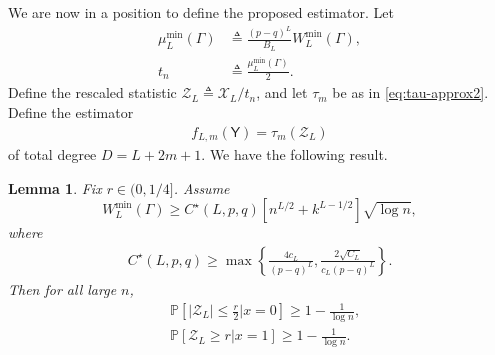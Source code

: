 \documentclass[12pt]{article}
\newtheorem{lemma}{Lemma}
\newcommand {\pr} {\mathbb{P}}
\newcommand{\pp}[1]{\left[#1\right]}
\newcommand{\ppp}[1]{\left\{#1\right\}}
\newcommand{\s}[1]{\mathsf{#1}}
\begin{document}
We are now in a position to define the proposed estimator. Let
\begin{align}
\mu_L^{\min}(\Gamma)&\triangleq\frac{(p-q)^L}{B_L}W_L^{\min}(\Gamma),\\
t_n&\triangleq\frac{\mu_L^{\min}(\Gamma)}{2}.
\end{align}
Define the rescaled statistic $\mathscr{Z}_L\triangleq \mathscr{X}_L/t_n$, and let $\tau_m$ be as in \eqref{eq:tau-approx2}. Define the estimator
\begin{align}
f_{L,m}(\s{Y})=\tau_m(\mathscr{Z}_L)\label{eqn:EstLStep}
\end{align}
of total degree $D=L+2m+1$. We have the following result.
\begin{lemma}\label{lem:HP-sep}
Fix $r\in(0,1/4]$. Assume
\begin{equation}\label{eq:W-ell-condition}
W_L^{\min}(\Gamma)\geq C^\star(L,p,q)\pp{n^{L/2}+k^{L-1/2}}\sqrt{\log n},
\end{equation}
where 
\begin{align}
C^\star(L,p,q)\geq \max\ppp{\frac{4c_L}{(p-q)^L},\frac{2\sqrt{C_L}}{c_L(p-q)^{L}}}.
\end{align}
Then for all large $n$,
\begin{align}
&\pr\pp{|\mathscr{Z}_L|\leq \tfrac{r}{2}\vert x=0}\ge1-\frac{1}{\log n},\\
&\pr\pp{\mathscr{Z}_L\geq r\vert x=1}\geq1-\frac{1}{\log n}.
\end{align}
\end{lemma}
\end{document}
